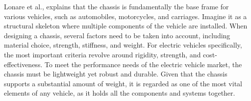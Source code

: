{		Lonare et al., explains that the chassis is fundamentally the base frame for various vehicles, such as automobiles, motorcycles, and carriages. Imagine it as a structural skeleton where multiple components of the vehicle are installed. When designing a chassis, several factors need to be taken into account, including material choice, strength, stiffness, and weight. For electric vehicles specifically, the most important criteria revolve around rigidity, strength, and cost-effectiveness. To meet the performance needs of the electric vehicle market, the chassis must be lightweight yet robust and durable. Given that the chassis supports a substantial amount of weight, it is regarded as one of the most vital elements of any vehicle, as it holds all the components and systems together. \cite{Lonare}\\
	}	
